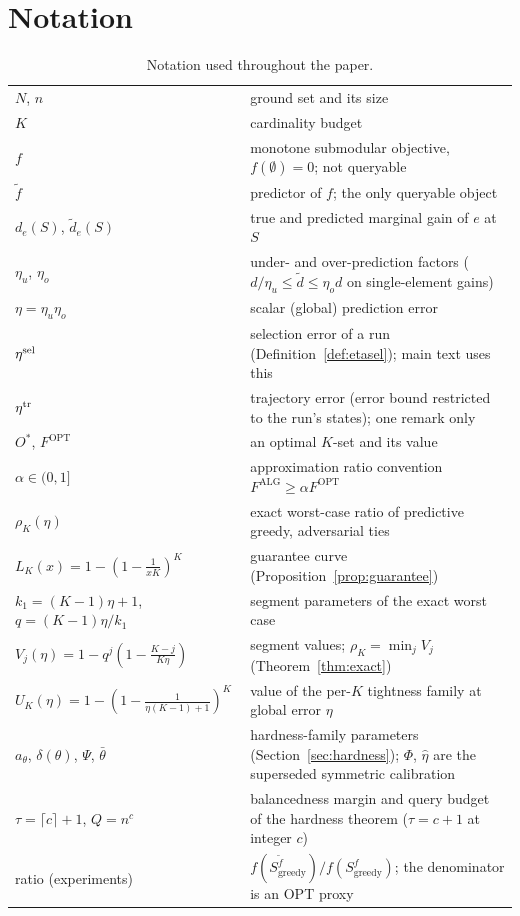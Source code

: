 \section{Notation}\label{sec:notation}

\begin{table}[h]
\centering
\caption{Notation used throughout the paper.}
\label{tab:notation}
\begin{tabular}{ll}
\toprule
$N$, $n$ & ground set and its size \\
$K$ & cardinality budget \\
$f$ & monotone submodular objective, $f(\emptyset)=0$; not queryable \\
$\tilde f$ & predictor of $f$; the only queryable object \\
$d_e(S)$, $\tilde d_e(S)$ & true and predicted marginal gain of $e$ at $S$ \\
$\eta_u$, $\eta_o$ & under- and over-prediction factors
  ($d/\eta_u\le\tilde d\le\eta_o d$ on single-element gains) \\
$\eta=\eta_u\eta_o$ & scalar (global) prediction error \\
$\eta^{\mathrm{sel}}$ & selection error of a run (Definition~\ref{def:etasel});
  main text uses this \\
$\eta^{\mathrm{tr}}$ & trajectory error (error bound restricted to the run's states);
  one remark only \\
$O^{\ast}$, $F^{\mathrm{OPT}}$ & an optimal $K$-set and its value \\
$\alpha\in(0,1]$ & approximation ratio convention
  $F^{\mathrm{ALG}}\ge\alpha F^{\mathrm{OPT}}$ \\
$\rho_K(\eta)$ & exact worst-case ratio of predictive greedy,
  adversarial ties \\
$L_K(x)=1-(1-\tfrac1{xK})^{K}$ & guarantee curve
  (Proposition~\ref{prop:guarantee}) \\
$k_1=(K-1)\eta+1$, $q=(K-1)\eta/k_1$ & segment parameters of the exact
  worst case \\
$V_j(\eta)=1-q^{j}(1-\tfrac{K-j}{K\eta})$ & segment values;
  $\rho_K=\min_jV_j$ (Theorem~\ref{thm:exact}) \\
$U_K(\eta)=1-(1-\tfrac1{\eta(K-1)+1})^{K}$ & value of the per-$K$ tightness
  family at global error $\eta$ \\
$a_\theta$, $\delta(\theta)$, $\Psi$, $\bar\theta$ & hardness-family
  parameters (Section~\ref{sec:hardness}); $\Phi$, $\hat\eta$ are the
  superseded symmetric calibration \\
$\tau=\lceil c\rceil+1$, $Q=n^{c}$ & balancedness margin and query budget
  of the hardness theorem ($\tau=c+1$ at integer $c$) \\
ratio (experiments) & $f(S^{\tilde f}_{\mathrm{greedy}})/
  f(S^{f}_{\mathrm{greedy}})$; the denominator is an OPT proxy \\
\bottomrule
\end{tabular}
\end{table}
